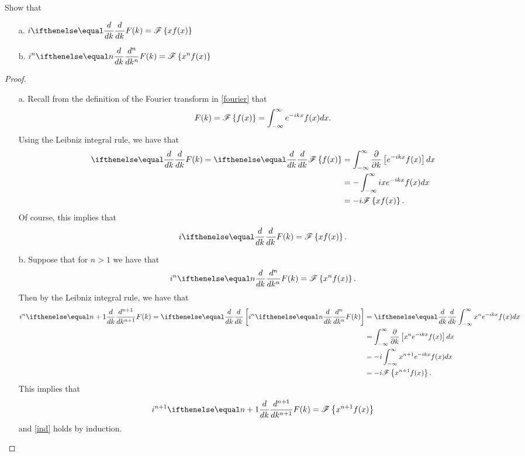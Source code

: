 \begin{problem}{2.3}
  Show that
  \begin{enumerate}
    \item [a.] $\displaystyle i \der{k}{} F(k) = \fourier{x f(x)}$
    \item [b.] $\displaystyle i^n \der{k}{n} F(k) = \fourier{x^n f(x)}$
  \end{enumerate}
\end{problem}

\begin{proof}
  \begin{enumerate}
    \item [a.] Recall from the definition of the Fourier transform in \eqref{fourier} that
      \begin{align*}
        F(k) = \mathscr{F}\left\{ {f(x)} \right\} = \int_{-\infty}^{\infty} e^{-ikx} f(x) dx.
      \end{align*}
      Using the Leibniz integral rule, we have that
      \begin{align*}
        \der{k}{}F(k) = \der{k}{}\fourier{f(x)} &= \int_{-\infty}^{\infty} \frac{\partial }{\partial k}\left[e^{-ikx} f(x)\right] dx\\
        &= -\int_{-\infty}^{\infty} ix e^{-ikx} f(x)dx \\
        &= - i \fourier{x f(x)}.
      \end{align*}
      Of course, this implies that
      \begin{align*}
        i \der{k}{}F(k) = \fourier{x f(x)}.
      \end{align*}
    \item [b.] Suppose that for $n  > 1$ we have that
      \begin{align}\label{ind}
        i^n \der{k}{n} F(k) = \fourier{x^n f(x)}.
      \end{align}
      Then by the Leibniz integral rule, we have that
      \begin{align*}
        i^n \der{k}{n+1} F(k) = \der{k}{}\left[i^n \der{k}{n} F(k)\right] &= \der{k}{} \int_{-\infty}^{\infty} x^n e^{-ikx} f(x) dx\\
        &= \int_{-\infty}^{\infty} \frac{\partial }{\partial k}\left[x^ne^{-ikx} f(x)\right] dx\\
        &= -i\int_{-\infty}^{\infty} x^{n+1} e^{-ikx} f(x)dx \\
        &= -i \fourier{x^{n+1}f(x)}.
      \end{align*}
      This implies that
      \begin{align*}
        i^{n+1} \der{k}{n+1} F(k) = \fourier{x^{n+1} f(x)}
      \end{align*}
      and \eqref{ind} holds by induction.
  \end{enumerate}
\end{proof}
\newpage
